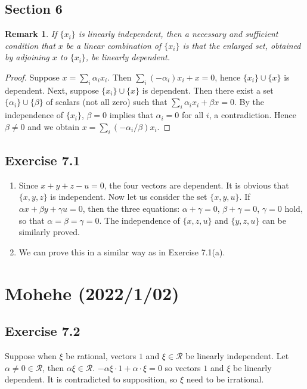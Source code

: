 \documentclass{article}
\theoremstyle{thmstyleone}
\theoremstyle{thmstyletwo}
\newtheorem{remark}[theorem]{Remark}
\theoremstyle{thmstylethree}
\newcommand\R{\mathcal R}
\begin{document}
\subsection{Section 6}
\begin{remark}
If $\{x_i\}$ is linearly independent, then a necessary and sufficient condition that $x$ be a linear combination of $\{x_i\}$ is that the enlarged set, obtained by adjoining $x$ to $\{x_i\}$, be linearly dependent.
\end{remark}
\begin{proof}
Suppose $x = \sum_i\alpha_i x_i$.
Then $\sum_i(-\alpha_i) x_i + x = 0$, hence $\{x_i\}\cup \{x\}$ is dependent.
Next, suppose $\{x_i\}\cup \{x\}$ is dependent.
Then there exist a set $\{\alpha_i\}\cup\{\beta\}$ of scalars (not all zero) such that $\sum_i\alpha_i x_i + \beta x = 0$.
By the independence of $\{x_i\}$, $\beta = 0$ implies that $\alpha_i = 0$ for all $i$, a contradiction.
Hence $\beta \ne 0$ and we obtain $x = \sum_i (-\alpha_i/\beta)x_i$.
\end{proof}

\subsection{Exercise 7.1}
\begin{enumerate}[label = (\alph*)]
\item 
Since $x+y+z-u=0$, the four vectors are dependent. 
It is obvious that $\{x, y, z\}$ is independent.
Now let us consider the set $\{x,y,u\}$.
If $\alpha x + \beta y + \gamma u = 0$, then the three equations: $\alpha + \gamma = 0$, $\beta + \gamma = 0$, $\gamma = 0$ hold, so that $\alpha=\beta=\gamma=0$.
The independence of $\{x,z,u\}$ and $\{y,z,u\}$ can be similarly proved.
\item
We can prove this in a similar way as in Exercise 7.1(a).
\end{enumerate}

\section{Mohehe (2022/1/02)}
\subsection{Exercise 7.2}
Suppose when $\xi$ be rational, vectors $1$ and $\xi\in\R$ be linearly independent.
Let $\alpha\ne0\in\R$, then $\alpha\xi \in\R$.
$-\alpha\xi\cdot1+\alpha\cdot\xi=0$ so vectors $1$ and $\xi$ be linearly dependent. It is contradicted to supposition, so $\xi$ need to be irrational.
\end{document}
